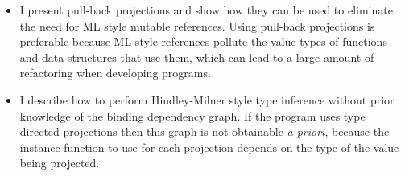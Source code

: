 \begin{itemize}
\item	I present pull-back projections and show how they can be used to eliminate the need for ML style mutable references. Using pull-back projections is preferable because ML style references pollute the value types of functions and data structures that use them, which can lead to a large amount of refactoring when developing programs.

\item	I describe how to perform Hindley-Milner style type inference without prior knowledge of the binding dependency graph. If the program uses type directed projections then this graph is not obtainable \emph{a priori}, because the instance function to use for each projection depends on the type of the value being projected.

\end{itemize}
